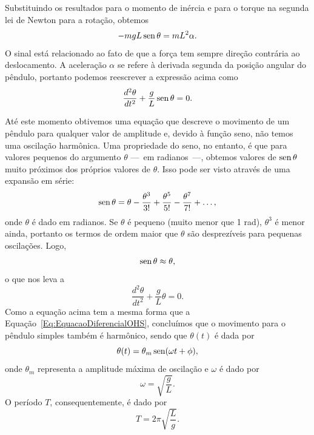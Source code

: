 Substituindo os resultados para o momento de inércia e para o torque na segunda lei de Newton para a rotação, obtemos
\begin{equation}
    -mgL\operatorname{sen}\theta = mL^2\alpha.
\end{equation}
%
O sinal está relacionado ao fato de que a força tem sempre direção contrária ao deslocamento. A aceleração $\alpha$ se refere à derivada segunda da posição angular do pêndulo, portanto podemos reescrever a expressão acima como
\begin{equation}
    \frac{d^2\theta}{dt^2} + \frac{g}{L} \operatorname{sen}\theta = 0.
\end{equation}

Até este momento obtivemos uma equação que descreve o movimento de um pêndulo para qualquer valor de amplitude e, devido à função seno, não temos uma oscilação harmônica. Uma propriedade do seno, no entanto, é que para valores pequenos do argumento $\theta$ ---~em radianos~---, obtemos valores de $\operatorname{sen}\theta$ muito próximos dos próprios valores de $\theta$. Isso pode ser visto através de uma expansão em série:
\begin{equation}
	\operatorname{sen}\theta = \theta -\frac{\theta^3}{3!}+\frac{\theta^5}{5!}-\frac{\theta^7}{7!}+\dots,
\end{equation}
%
onde $\theta$ é dado em radianos. Se $\theta$ é pequeno (muito menor que 1 rad), $\theta^3$ é menor ainda, portanto os termos de ordem maior que $\theta$ são desprezíveis para pequenas oscilações. Logo,
\begin{equation}
    \operatorname{sen}\theta \approx \theta,
\end{equation}
%
o que nos leva a
\begin{equation}
	\frac{d^2\theta}{dt^2} + \frac{g}{L}\theta = 0.
\end{equation}
%
Como a equação acima tem a mesma forma que a Equação~\ref{Eq:EquacaoDiferencialOHS}, concluímos que o movimento para o pêndulo simples também é harmônico, sendo que $\theta(t)$ é dada por
\begin{equation}
    \theta(t) = \theta_m \operatorname{sen}(\omega t + \phi),
\end{equation}
%
onde $\theta_m$ representa a amplitude máxima de oscilação e $\omega$ é dado por
\begin{equation}
    \omega = \sqrt{\frac{g}{L}}.
\end{equation}
%
O período $T$, consequentemente, é dado por
\begin{equation}
	T = 2\pi \sqrt{\frac{L}{g}}.
\end{equation}


